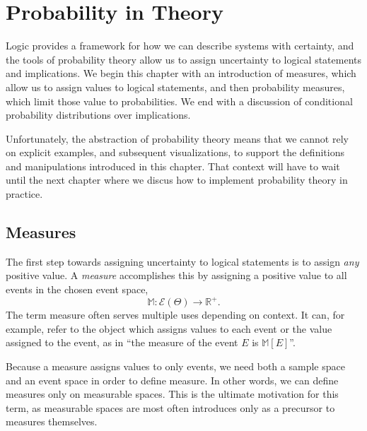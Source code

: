 \chapter{Probability in Theory}

Logic provides a framework for how we can describe systems with certainty,
and the tools of probability theory allow us to assign uncertainty to logical
statements and implications.  We begin this chapter with an introduction of
measures, which allow us to assign values to logical statements, and then
probability measures, which limit those value to probabilities.  We end with
a discussion of conditional probability distributions over implications.

Unfortunately, the abstraction of probability theory means that we cannot rely 
on explicit examples, and subsequent visualizations, to support the definitions 
and manipulations introduced in this chapter.  That context will have to wait
until the next chapter where we discus how to implement probability theory
in practice.

\section{Measures}

The first step towards assigning uncertainty to logical statements is to
assign \emph{any} positive value.  A \emph{measure} accomplishes this
by assigning a positive value to all events in the chosen event space,
%
\begin{equation*}
\mathbb{M} : \mathcal{E} \! \left( \Theta \right) \rightarrow \mathbb{R}^{+}.
\end{equation*}
%
The term measure often serves multiple uses depending on context.
It can, for example, refer to the object which assigns values to each
event or the value assigned to the event, as in ``the measure of the 
event $E$ is $\mathbb{M} \! \left[ E \right]$''.

Because a measure assigns values to only events, we need both a
sample space and an event space in order to define measure.  In
other words, we can define measures only on measurable spaces.  
This is the ultimate motivation for this term, as measurable spaces 
are most often introduces only as a precursor to measures themselves.

